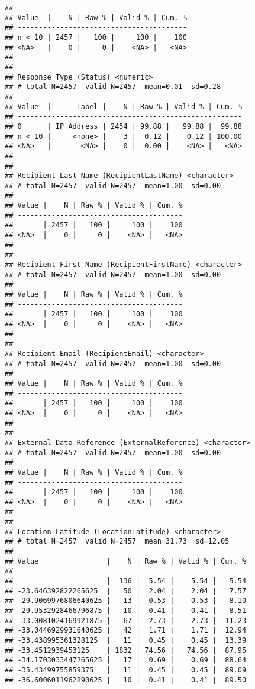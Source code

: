 \documentclass[
  10,
  landscape,
  legalpaper]{article}
\begin{document}
\begin{verbatim}
## 
## Value  |    N | Raw % | Valid % | Cum. %
## ----------------------------------------
## n < 10 | 2457 |   100 |     100 |    100
## <NA>   |    0 |     0 |    <NA> |   <NA>
## 
## 
## Response Type (Status) <numeric>
## # total N=2457  valid N=2457  mean=0.01  sd=0.28
## 
## Value  |      Label |    N | Raw % | Valid % | Cum. %
## -----------------------------------------------------
## 0      | IP Address | 2454 | 99.88 |   99.88 |  99.88
## n < 10 |     <none> |    3 |  0.12 |    0.12 | 100.00
## <NA>   |       <NA> |    0 |  0.00 |    <NA> |   <NA>
## 
## 
## Recipient Last Name (RecipientLastName) <character>
## # total N=2457  valid N=2457  mean=1.00  sd=0.00
## 
## Value |    N | Raw % | Valid % | Cum. %
## ---------------------------------------
##       | 2457 |   100 |     100 |    100
## <NA>  |    0 |     0 |    <NA> |   <NA>
## 
## 
## Recipient First Name (RecipientFirstName) <character>
## # total N=2457  valid N=2457  mean=1.00  sd=0.00
## 
## Value |    N | Raw % | Valid % | Cum. %
## ---------------------------------------
##       | 2457 |   100 |     100 |    100
## <NA>  |    0 |     0 |    <NA> |   <NA>
## 
## 
## Recipient Email (RecipientEmail) <character>
## # total N=2457  valid N=2457  mean=1.00  sd=0.00
## 
## Value |    N | Raw % | Valid % | Cum. %
## ---------------------------------------
##       | 2457 |   100 |     100 |    100
## <NA>  |    0 |     0 |    <NA> |   <NA>
## 
## 
## External Data Reference (ExternalReference) <character>
## # total N=2457  valid N=2457  mean=1.00  sd=0.00
## 
## Value |    N | Raw % | Valid % | Cum. %
## ---------------------------------------
##       | 2457 |   100 |     100 |    100
## <NA>  |    0 |     0 |    <NA> |   <NA>
## 
## 
## Location Latitude (LocationLatitude) <character>
## # total N=2457  valid N=2457  mean=31.73  sd=12.05
## 
## Value                |    N | Raw % | Valid % | Cum. %
## ------------------------------------------------------
##                      |  136 |  5.54 |    5.54 |   5.54
## -23.646392822265625  |   50 |  2.04 |    2.04 |   7.57
## -29.9069976806640625 |   13 |  0.53 |    0.53 |   8.10
## -29.9532928466796875 |   10 |  0.41 |    0.41 |   8.51
## -33.0081024169921875 |   67 |  2.73 |    2.73 |  11.23
## -33.0446929931640625 |   42 |  1.71 |    1.71 |  12.94
## -33.438995361328125  |   11 |  0.45 |    0.45 |  13.39
## -33.4512939453125    | 1832 | 74.56 |   74.56 |  87.95
## -34.1703033447265625 |   17 |  0.69 |    0.69 |  88.64
## -35.43499755859375   |   11 |  0.45 |    0.45 |  89.09
## -36.6006011962890625 |   10 |  0.41 |    0.41 |  89.50

\end{verbatim}
\end{document}
